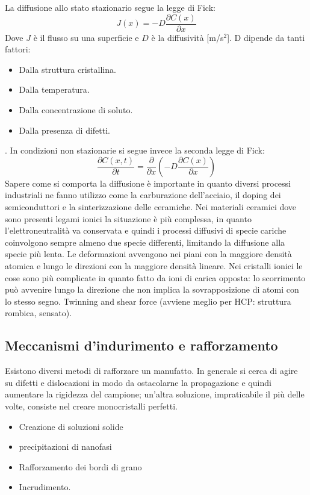 La diffusione allo stato stazionario segue la legge di Fick:
\begin{equation}
    J(x)=-D\frac{\partial C(x)}{\partial x}
\end{equation}
Dove $J$ è il flusso su una superficie e $D$ è la diffusività [m/s$^2$]. D dipende da tanti fattori:
\begin{itemize}
    \item Dalla struttura cristallina.
    \item Dalla temperatura.
    \item Dalla concentrazione di soluto.
    \item Dalla presenza di difetti.
\end{itemize}.
In condizioni non stazionarie si segue invece la seconda legge di Fick:
\begin{equation}
    \frac{\partial C(x,t)}{\partial t}=\frac{\partial }{\partial x}\left(-D\frac{\partial C(x)}{\partial x}\right)
\end{equation}
Sapere come si comporta la diffusione è importante in quanto diversi processi industriali ne fanno utilizzo come la carburazione dell'acciaio, il doping dei semiconduttori e la sinterizzazione delle ceramiche. Nei materiali ceramici dove sono presenti legami ionici la situazione è più complessa, in quanto l'elettroneutralità va conservata e quindi i processi diffusivi di specie cariche coinvolgono sempre almeno due specie differenti, limitando la diffusione alla specie più lenta.
Le deformazioni avvengono nei piani con la maggiore densità atomica e lungo le direzioni con la maggiore densità lineare.
Nei cristalli ionici le cose sono più complicate in quanto fatto da ioni di carica opposta: lo scorrimento può avvenire lungo la direzione che non implica la sovrapposizione di atomi con lo stesso segno.
Twinning and shear force (avviene meglio per HCP: struttura rombica, sensato). 

\subsection{Meccanismi d'indurimento e rafforzamento}

Esistono diversi metodi di rafforzare un manufatto. In generale si cerca di agire su difetti e dislocazioni in modo da ostacolarne la propagazione e quindi aumentare la rigidezza del campione; un'altra soluzione, impraticabile il più delle volte, consiste nel creare monocristalli perfetti.

\begin{itemize}
    \item Creazione di soluzioni solide
    \item precipitazioni di nanofasi
    \item Rafforzamento dei bordi di grano
    \item Incrudimento.
\end{itemize}

